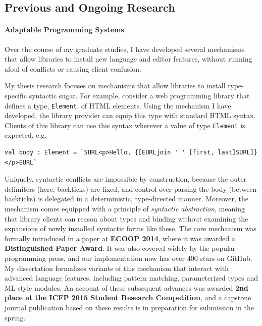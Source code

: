 \documentclass[9pt]{extarticle}
\let\li\lstinline
\begin{document}

\vspace{-8px}
\subsection*{Previous and Ongoing Research}
\vspace{-2px}
\paragraph{Adaptable Programming Systems}

Over the course of my graduate studies, I have developed several mechanisms that allow libraries to install new language and editor features, without running afoul of conflicts or causing client confusion.

My thesis research focuses on mechanisms that allow libraries to install type-specific syntactic sugar. For example, consider a web programming library that defines a type, \li{Element}, of HTML elements. Using the mechanism I have developed, the library provider can equip this type with standard HTML syntax. Clients of this library can use this syntax wherever a value of type \li{Element} is expected, e.g.
\begin{lstlisting}[numbers=none]
val body : Element = `SURL<p>Hello, {[EURLjoin ' ' [first, last]SURL]}</p>EURL`
\end{lstlisting}
Uniquely, syntactic conflicts are impossible by construction, because the outer delimiters (here, backticks) are fixed, and control over parsing the body (between backticks) is delegated in a deterministic, type-directed manner. Moreover, the mechanism comes equipped with a principle of \emph{syntactic abstraction}, meaning that library clients can reason about types and binding without examining the expansions of newly installed syntactic forms like these. The core mechanism was formally introduced in a paper at \textbf{ECOOP 2014}, where it was awarded a \textbf{Distinguished Paper Award}. It was  also covered widely by the popular programming press, and our implementation now has over 400 stars on GitHub. 
My dissertation formalizes variants of this mechanism that interact with advanced language features, including pattern matching, parameterized types and ML-style modules. An account of these subsequent advances was awarded \textbf{2nd place at the ICFP 2015 Student Research Competition}, and a capstone journal publication based on these results is in preparation for submission in the spring.
\end{document}
